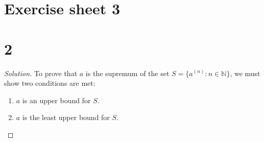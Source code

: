 \documentclass[12pt,a4paper]{article}
\theoremstyle{definition}
\theoremstyle{remark}
\newenvironment{solution}{\begin{proof}[Solution]}{\end{proof}}
\begin{document}
\section*{Exercise sheet 3}

\section*{2}
\begin{solution}
To prove that $a$ is the supremum of the set $S = \{a^{(n)} : n \in \mathbb{N}\}$, we must show two conditions are met:
\begin{enumerate}
    \item $a$ is an upper bound for $S$.
    \item $a$ is the least upper bound for $S$.
\end{enumerate}
\end{solution}
\end{document}
